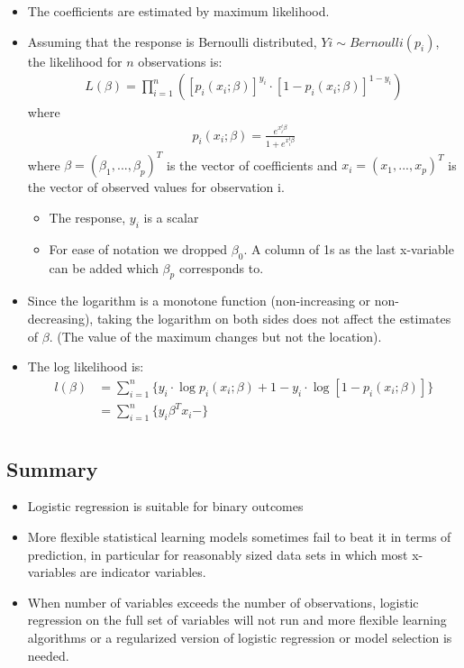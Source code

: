 \documentclass[12pt, oneside]{article}
\begin{document}
\begin{itemize}
    \item The coefficients are estimated by maximum likelihood.
    \item Assuming that the response is Bernoulli distributed, $Yi \sim Bernoulli(p_i)$, the likelihood for $n$ observations is:
    \begin{align*}
        L(\beta) = \prod_{i=1}^{n}([p_i(x_i;\beta)]^{y_i} \cdot [1-p_i(x_i;\beta)]^{1-y_i})
    \end{align*}
    where
    \begin{align*}
        p_i(x_i;\beta) =\frac{e^{x^t_i\beta}}{1+ e^{x^t_i\beta}} 
    \end{align*}
    where $\beta = (\beta_1,...,\beta_p)^T$ is the vector of coefficients and $x_i = (x_1,...,x_p)^T$ is the vector of observed values for observation i.
    \begin{itemize}
        \item The response, $y_i$ is a scalar
        \item For ease of notation we dropped $\beta_0$. A column of 1s as the last x-variable can be added which $\beta_p$ corresponds to.
    \end{itemize}
    \item Since the logarithm is a monotone function (non-increasing or non-decreasing), taking the logarithm on both sides does not affect the estimates of $\beta$. (The value of the maximum changes but not the location).
    \item The log likelihood is:
    \begin{align*}
        l(\beta) &= \sum^n_{i=1}\{{y_i} \cdot \log p_i(x_i;\beta) + {1-y_i} \cdot \log[1-p_i(x_i;\beta)]\} \\
        &=\sum^n_{i=1}\{y_i\beta^Tx_i - \}\\
    \end{align*}
\end{itemize}

\subsection{Summary}
\begin{itemize}
    \item Logistic regression is suitable for binary outcomes
    \item More flexible statistical learning models sometimes fail to beat it in terms of prediction, in particular for reasonably sized data sets in which most x-variables are indicator variables. 
    \item When number of variables exceeds the number of observations, logistic regression on the full set of variables will not run and more flexible learning algorithms or a regularized version of logistic regression or model selection is needed.
\end{itemize}
\end{document}
